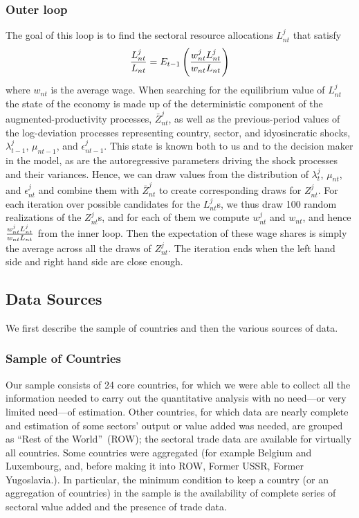\documentclass[12pt]{article}
\begin{document}
\subsubsection*{Outer loop}

The goal of this loop is to find the sectoral resource allocations $%
L_{nt}^{j}$ that satisfy %
\begin{equation*}
\frac{L_{nt}^{j}}{L_{nt}}=E_{t-1}\left( \frac{w_{nt}^{j}L_{nt}^{j}}{%
w_{nt}L_{nt}}\right)
\end{equation*}%
where $w_{nt}$ is the average wage. When searching for the
equilibrium value of $L_{nt}^{j}$ the state of the economy is made
up of the deterministic component of the augmented-productivity processes, $%
\bar{Z}_{nt}^{j}$, as well as the previous-period values of the
log-deviation processes representing country, sector, and idyosincratic
shocks, $\lambda _{t-1}^{j}$, $\mu _{nt-1}$, and $%
\epsilon _{nt-1}^{j}$. This state is known both to us and to the
decision maker in the model, as are the autoregressive parameters driving the
shock processes and their variances. Hence, we can draw values from the
distribution of $\lambda _{t}^{j}$, $\mu _{nt}$, and $%
\epsilon _{nt}^{j}$ and combine them with $\bar{Z}_{nt}^{j}$
to create corresponding draws for $Z_{nt}^{j}$. For each iteration
over possible candidates for the $L_{nt}^{j}$s, we thus draw 100
random realizations of the $Z_{nt}^{j}$s, and for each of them we
compute $w_{nt}^{j}$ and $w_{nt}$, and hence $\frac{%
w_{nt}^{j}L_{nt}^{j}}{w_{nt}L_{nt}}$ from the inner loop. Then the
expectation of these wage shares is simply the average across all the draws
of $Z_{nt}^{j}$. The iteration ends when the left hand side and
right hand side are close enough.

\subsection*{Data Sources}

We first describe the sample of countries and then the various sources of
data.

\subsubsection*{Sample of Countries}

Our sample consists of 24 core countries, for which we were able to collect
all the information needed to carry out the quantitative analysis with no
need---or very limited need---of estimation. Other countries, for which data
are nearly complete and estimation of some sectors' output or value added
was needed, are grouped as \textquotedblleft Rest of the
World\textquotedblright\ (ROW); the sectoral trade data are available for
virtually all countries. Some countries were aggregated (for example Belgium
and Luxembourg, and, before making it into ROW, Former USSR, Former
Yugoslavia.). In particular, the minimum condition to keep a country (or an
aggregation of countries) in the sample is the availability of complete
series of sectoral value added and the presence of trade data.
\end{document}
